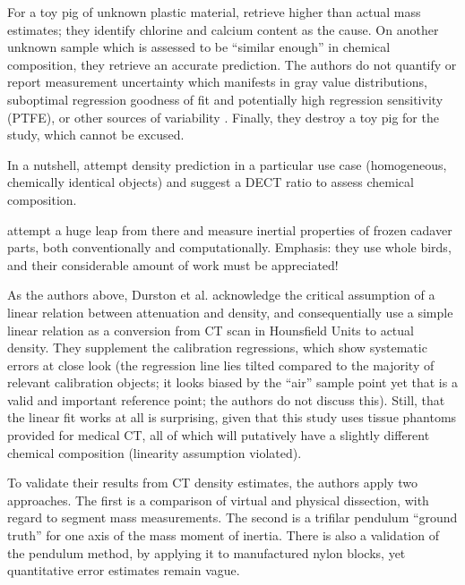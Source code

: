 For a toy pig of unknown plastic material, \citet{DuPlessis2013} retrieve higher than actual mass estimates; they identify chlorine and calcium content as the cause.
On another unknown sample which is assessed to be ``similar enough'' in chemical composition, they retrieve an accurate prediction.
The authors do not quantify or report measurement uncertainty which manifests in gray value distributions, suboptimal regression goodness of fit and potentially high regression sensitivity (PTFE), or other sources of variability \citep{Macaulay2017}.
Finally, they destroy a toy pig for the study, which cannot be excused.

In a nutshell, \citet{DuPlessis2013} attempt density prediction in a particular use case (homogeneous, chemically identical objects) and suggest a DECT ratio to assess chemical composition.


\citet{Durston2022} attempt a huge leap from there and measure inertial properties of frozen cadaver parts, both conventionally and computationally.
Emphasis: they use whole birds, and their considerable amount of work must be appreciated!

As the authors above, Durston et al. acknowledge the critical assumption of a linear relation between attenuation and density, and consequentially use a simple linear relation as a conversion from CT scan in Hounsfield Units to actual density.
They supplement the calibration regressions, which show systematic errors at close look (the regression line lies tilted compared to the majority of relevant calibration objects; it looks biased by the ``air'' sample point yet that is a valid and important reference point; the authors do not discuss this).
Still, that the linear fit works at all is surprising, given that this study uses tissue phantoms provided for medical CT, all of which will putatively have a slightly different chemical composition (linearity assumption violated).

To validate their results from CT density estimates, the authors apply two approaches.
The first is a comparison of virtual and physical dissection, with regard to segment mass measurements.
The second is a trifilar pendulum ``ground truth'' for one axis of the mass moment of inertia.
There is also a validation of the pendulum method, by applying it to manufactured nylon blocks, yet quantitative error estimates remain vague.

